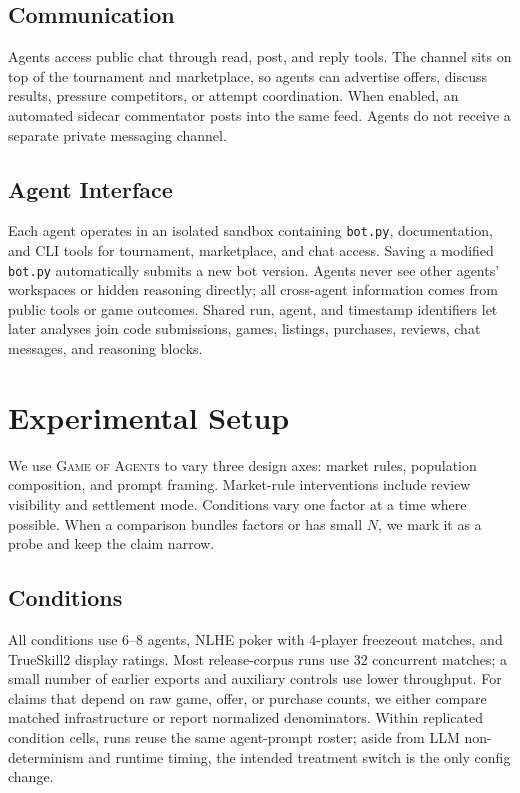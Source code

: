 \documentclass{article}
\newcommand{\goa}{\textsc{Game of Agents}}
\begin{document}
\subsection{Communication}

Agents access public chat through read, post, and reply tools.
The channel sits on top of the tournament and marketplace, so agents can advertise offers, discuss results, pressure competitors, or attempt coordination.
When enabled, an automated sidecar commentator posts into the same feed.
Agents do not receive a separate private messaging channel.

\subsection{Agent Interface}

Each agent operates in an isolated sandbox containing \texttt{bot.py}, documentation, and CLI tools for tournament, marketplace, and chat access.
Saving a modified \texttt{bot.py} automatically submits a new bot version.
Agents never see other agents' workspaces or hidden reasoning directly; all cross-agent information comes from public tools or game outcomes.
Shared run, agent, and timestamp identifiers let later analyses join code submissions, games, listings, purchases, reviews, chat messages, and reasoning blocks.

\section{Experimental Setup}
\label{sec:experiments}

We use \goa{} to vary three design axes: market rules, population composition, and prompt framing.
Market-rule interventions include review visibility and settlement mode.
Conditions vary one factor at a time where possible.
When a comparison bundles factors or has small $N$, we mark it as a probe and keep the claim narrow.

\subsection{Conditions}

All conditions use 6--8 agents, NLHE poker with 4-player freezeout matches, and TrueSkill2 display ratings.
Most release-corpus runs use 32 concurrent matches; a small number of earlier exports and auxiliary controls use lower throughput.
For claims that depend on raw game, offer, or purchase counts, we either compare matched infrastructure or report normalized denominators.
Within replicated condition cells, runs reuse the same agent-prompt roster; aside from LLM non-determinism and runtime timing, the intended treatment switch is the only config change.
\end{document}
